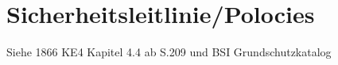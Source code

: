 \section*{Sicherheitsleitlinie/Polocies}
Siehe 1866 KE4 Kapitel 4.4 ab S.209 und BSI Grundschutzkatalog